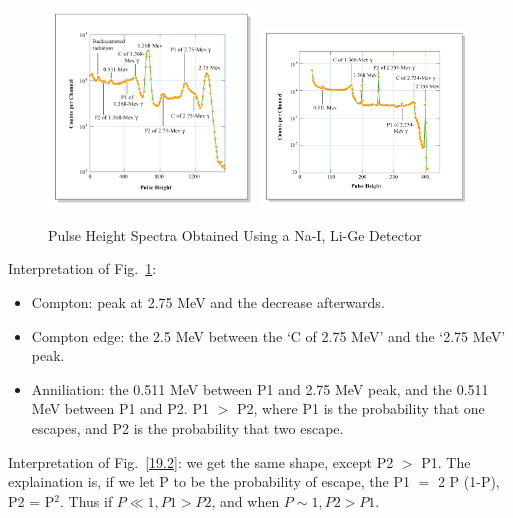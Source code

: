 \documentclass{school-22.101-notes}
\begin{document}
  \begin{figure}[ht]
    \centering
    \includegraphics[width=0.49\textwidth]{images/ni/19.1.png} 
    \includegraphics[width=0.49\textwidth]{images/ni/19.2.png} 
    \caption{Pulse Height Spectra Obtained Using a Na-I, Li-Ge Detector} \label{19.1} 
  \end{figure}

Interpretation of Fig.~\ref{19.1}:
\begin{itemize}
\item Compton: peak at 2.75 MeV and the decrease afterwards.
\item Compton edge: the 2.5 MeV between the `C of 2.75 MeV' and the `2.75 MeV' peak. 
\item Anniliation: the 0.511 MeV between P1 and 2.75 MeV peak, and the 0.511 MeV between P1 and P2. P1 $>$ P2, where P1 is the probability that one escapes, and P2 is the probability that two escape. 
\end{itemize}

Interpretation of Fig.~\ref{19.2}: we get the same shape, except P2 $>$ P1. The explaination is, if we let P to be the probability of escape, the P1 $=$ 2 P (1-P), P2 = P$^2$. Thus if $P \ll 1, P1 > P2$, and when $P\sim 1, P2 > P1$. 
\end{document}
